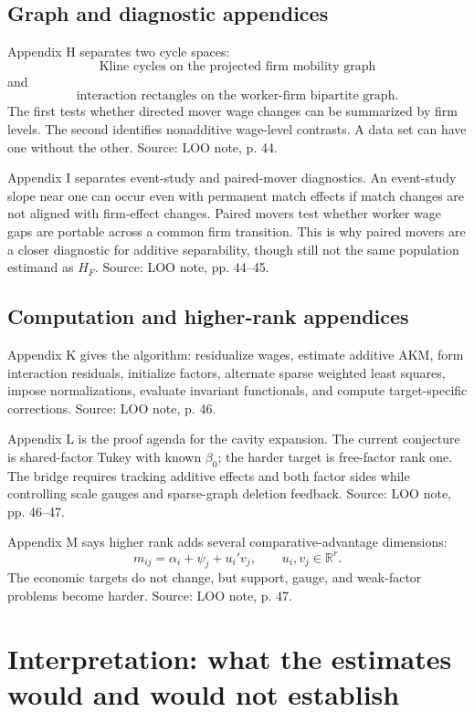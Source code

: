 \documentclass[11pt]{article}
\newcommand{\R}{\mathbb{R}}
\begin{document}
\subsection{Graph and diagnostic appendices}

Appendix H separates two cycle spaces:
\[
\text{Kline cycles on the projected firm mobility graph}
\]
and
\[
\text{interaction rectangles on the worker-firm bipartite graph}.
\]
The first tests whether directed mover wage changes can be summarized by firm
levels. The second identifies nonadditive wage-level contrasts. A data set can
have one without the other. Source: LOO note, p. 44.

Appendix I separates event-study and paired-mover diagnostics. An event-study
slope near one can occur even with permanent match effects if match changes are
not aligned with firm-effect changes. Paired movers test whether worker wage
gaps are portable across a common firm transition. This is why paired movers are
a closer diagnostic for additive separability, though still not the same
population estimand as \(H_F\). Source: LOO note, pp. 44--45.

\subsection{Computation and higher-rank appendices}

Appendix K gives the algorithm: residualize wages, estimate additive AKM, form
interaction residuals, initialize factors, alternate sparse weighted least
squares, impose normalizations, evaluate invariant functionals, and compute
target-specific corrections. Source: LOO note, p. 46.

Appendix L is the proof agenda for the cavity expansion. The current conjecture
is shared-factor Tukey with known \(\beta_0\); the harder target is free-factor
rank one. The bridge requires tracking additive effects and both factor sides
while controlling scale gauges and sparse-graph deletion feedback. Source: LOO
note, pp. 46--47.

Appendix M says higher rank adds several comparative-advantage dimensions:
\[
m_{ij}=\alpha_i+\psi_j+u_i'v_j,\qquad u_i,v_j\in\R^r.
\]
The economic targets do not change, but support, gauge, and weak-factor problems
become harder. Source: LOO note, p. 47.

\section{Interpretation: what the estimates would and would not establish}
\end{document}

